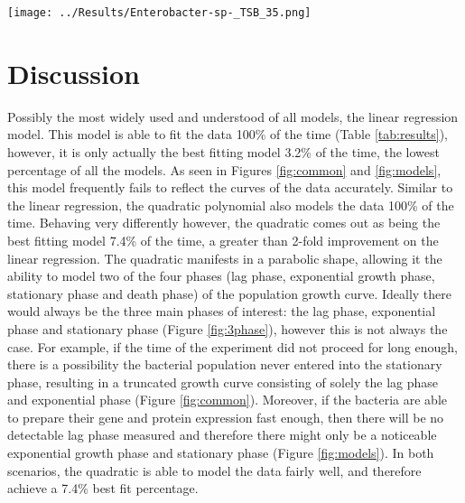\documentclass[11pt, a4paper]{article} %
\begin{document}
\begin{SCfigure}[][h!]
\centering
\texttt{[image: ../Results/Enterobacter-sp-\_TSB\_35.png]}
\caption{A plot showing all the models converging on the dataset where \textit{Enterobacter sp} is growing on a TSB medium at 35\textcelsius{}. Here we have a two phase growth curve, with a exponential phase and a stationary phase.}
\label{fig:models}
\end{SCfigure}


\section{Discussion}

Possibly the most widely used and understood of all models, the linear regression model. This model is able to fit the data 100\% of the time (Table \ref{tab:results}), however, it is only actually the best fitting model 3.2\% of the time, the lowest percentage of all the models. As seen in Figures \ref{fig:common} and \ref{fig:models}, this model frequently fails to reflect the curves of the data accurately. Similar to the linear regression, the quadratic polynomial also models the data 100\% of the time. Behaving very differently however, the quadratic comes out as being the best fitting model 7.4\% of the time, a greater than 2-fold improvement on the linear regression. The quadratic manifests in a parabolic shape, allowing it the ability to model two of the four phases (lag phase, exponential growth phase, stationary phase and death phase) of the population growth curve. Ideally there would always be the three main phases of interest: the lag phase, exponential phase and stationary phase \citep{RN106} (Figure \ref{fig:3phase}), however this is not always the case. For example, if the time of the experiment did not proceed for long enough, there is a possibility the bacterial population never entered into the stationary phase, resulting in a truncated growth curve consisting of solely the lag phase and exponential phase (Figure \ref{fig:common}). Moreover, if the bacteria are able to prepare their gene and protein expression fast enough, then there will be no detectable lag phase measured and therefore there might only be a noticeable exponential growth phase and stationary phase (Figure \ref{fig:models}). In both scenarios, the quadratic is able to model the data fairly well, and therefore achieve a 7.4\% best fit percentage.
\end{document}
